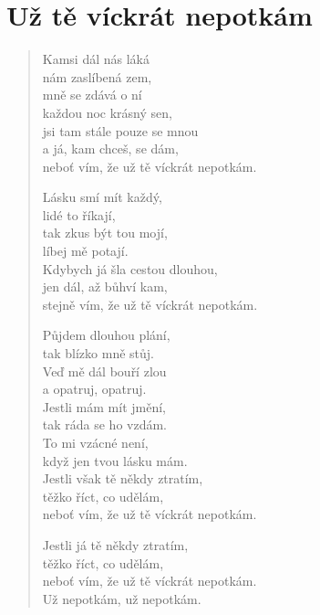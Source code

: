 \section{Už tě víckrát nepotkám}

\begin{verse}
Kamsi dál nás láká \\
nám zaslíbená zem,\\
mně se zdává o ní\\
každou noc krásný sen,\\
jsi tam stále pouze se mnou\\
a já, kam chceš, se dám,\\
neboť vím, že už tě víckrát nepotkám.

Lásku smí mít každý, \\
lidé to říkají, \\
tak zkus být tou mojí, \\
líbej mě potají. \\
Kdybych já šla cestou dlouhou, \\
jen dál, až bůhví kam, \\
stejně vím, že už tě víckrát nepotkám.

Půjdem dlouhou plání, \\
tak blízko mně stůj. \\
Veď mě dál bouří zlou \\
a opatruj, opatruj. \\

Jestli mám mít jmění, \\
tak ráda se ho vzdám. \\
To mi vzácné není, \\
když jen tvou lásku mám. \\
Jestli však tě někdy ztratím, \\
těžko říct, co udělám, \\
neboť vím, že už tě víckrát nepotkám. 

Jestli já tě někdy ztratím, \\
těžko říct, co udělám, \\
neboť vím, že už tě víckrát nepotkám. \\
Už nepotkám, už nepotkám.
\end{verse}
